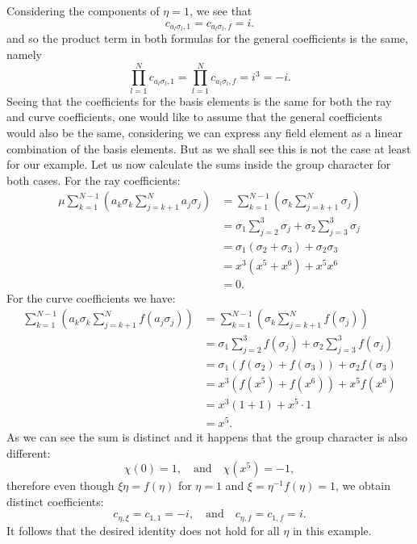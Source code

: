 \documentclass[a4paper]{article}
\begin{document}
  Considering the components of $\eta = 1$, we see that
  \begin{equation}
    c_{a_l \sigma_l, 1}
    = c_{a_l \sigma_l, f}
    = i.
  \end{equation}
  and so the product term in both formulas for the general
  coefficients is the same, namely
  \begin{equation}
    \prod_{l=1}^N c_{a_l \sigma_l, 1}
    = \prod_{l=1}^N c_{a_l \sigma_l, f}
    = i^3
    = -i.
  \end{equation}
  Seeing that the coefficients for the basis elements is the
  same for both the ray and curve coefficients, one would
  like to assume that the general coefficients would also be
  the same, considering we can express any field element as
  a linear combination of the basis elements. But as we
  shall see this is not the case at least for our example.
  Let us now calculate the sums inside the group character
  for both cases. For the ray coefficients:
  \begin{align}
    \mu \sum_{k=1}^{N-1} \left( 
      a_k \sigma_k \sum_{j=k+1}^{N} a_j \sigma_j
    \right) 
    &= \sum_{k=1}^{N-1} \left( 
      \sigma_k \sum_{j=k+1}^{N} \sigma_j
    \right) \\
    &= \sigma_1 \sum_{j=2}^{3} \sigma_j
    + \sigma_2 \sum_{j=3}^{3} \sigma_j \\
    &= \sigma_1 \left( \sigma_2 + \sigma_3 \right) 
    + \sigma_2 \sigma_3 \\
    &= x^3 (x^{5} + x^{6}) + x^5 x^6 \\
    &= 0.
  \end{align}
  For the curve coefficients we have:
  \begin{align}
    \sum_{k=1}^{N-1} \left( 
      a_k \sigma_k \sum_{j=k+1}^{N} f(a_j \sigma_j)
    \right) 
    &= \sum_{k=1}^{N-1} \left( 
      \sigma_k \sum_{j=k+1}^{N} f(\sigma_j)
    \right) \\
    &= \sigma_1 \sum_{j=2}^{3} f(\sigma_j)
    + \sigma_2 \sum_{j=3}^{3} f(\sigma_j) \\
    &= \sigma_1 \left( f(\sigma_2) + f(\sigma_3) \right) 
    + \sigma_2 f(\sigma_3) \\
    &= x^3 \left( f(x^5) + f(x^6) \right) 
    + x^5 f(x^6) \\
    &= x^3 \left( 1 + 1 \right) + x^5 \cdot 1 \\
    &= x^5.
  \end{align}
  As we can see the sum is distinct and it happens that the
  group character is also different:
  \begin{equation}
    \chi(0) = 1,
    \quad
    \text{and}
    \quad
    \chi(x^5) = -1,
  \end{equation}
  therefore even though $\xi \eta = f(\eta)$ for $\eta = 1$
  and $\xi = \eta^{-1}f(\eta) = 1$, we obtain distinct
  coefficients:
  \begin{equation}
    c_{\eta,\xi} = c_{1,1} = -i,
    \quad
    \text{and}
    \quad
    c_{\eta,f} = c_{1,f} = i.
  \end{equation}
  It follows that the desired identity does not hold for all
  $\eta$ in this example.
\end{document}
